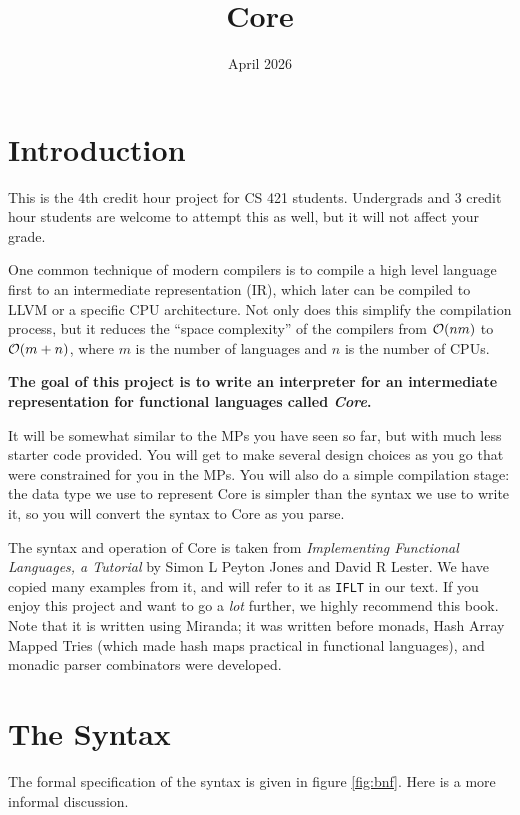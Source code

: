 \documentclass[11pt]{article}
\date{April 2026}
\title{Core}
\begin{document}
\maketitle
\tableofcontents

\section{Introduction}
\label{sec:org269edae}

This is the 4th credit hour project for CS 421 students.  Undergrads and 3 credit hour students are welcome
to attempt this as well, but it will not affect your grade.

One common technique of modern compilers is to compile a high level language first to an intermediate representation (IR),
which later can be compiled to LLVM or a specific CPU architecture.  Not only does this simplify the compilation process,
but it reduces the ``space complexity'' of the compilers from \({\cal O}(nm)\) to \({\cal O}(m + n)\), where \(m\) is the
number of languages and \(n\) is the number of CPUs.

\textbf{The goal of this project is to write an interpreter for an intermediate representation for functional languages called \emph{Core}.}

It will be somewhat similar to the MPs you have seen so far, but with much less starter code provided.  You will get to make several
design choices as you go that were constrained for you in the MPs.  You will also do a simple compilation stage: the data type we use
to represent Core is simpler than the syntax we use to write it, so you will convert the syntax to Core as you parse.

The syntax and operation of Core is taken from \emph{Implementing Functional Languages, a Tutorial} by Simon L Peyton Jones
and David R Lester.  We have copied many examples from it, and will refer to it as \texttt{IFLT} in our text.  If you enjoy
this project and want to go a \emph{lot} further, we highly recommend this book.  Note that it is written using Miranda; it
was written before monads, Hash Array Mapped Tries (which made hash maps practical in functional languages), and monadic
parser combinators were developed.
\section{The Syntax}
\label{sec:orgf4e9992}

The formal specification of the syntax is given in figure \ref{fig:bnf}.  Here is a more informal discussion.
\end{document}
